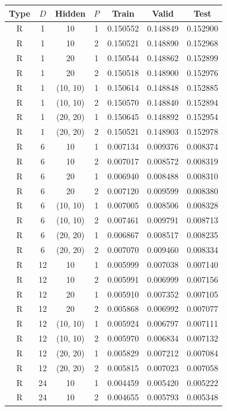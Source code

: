 \documentclass[10pt,a4paper]{article}
\begin{document}
\begin{table}[h]
\centering
\begin{tabular}{|c|c|c|c||c|c|c|}
\hline
Type & $D$ & Hidden & $P$ & Train & Valid & Test\\
\hline
R & 1 & 10 & 1 & 0.150552 & 0.148849 & 0.152900\\
R & 1 & 10 & 2 & 0.150521 & 0.148890 & 0.152968\\
R & 1 & 20 & 1 & 0.150544 & 0.148862 & 0.152899\\
R & 1 & 20 & 2 & 0.150518 & 0.148900 & 0.152976\\
R & 1 & (10, 10) & 1 & 0.150614 & 0.148848 & 0.152885\\
R & 1 & (10, 10) & 2 & 0.150570 & 0.148840 & 0.152894\\
R & 1 & (20, 20) & 1 & 0.150645 & 0.148892 & 0.152954\\
R & 1 & (20, 20) & 2 & 0.150521 & 0.148903 & 0.152978\\
\hline
R & 6 & 10 & 1 & 0.007134 & 0.009376 & 0.008374\\
R & 6 & 10 & 2 & 0.007017 & 0.008572 & 0.008319\\
R & 6 & 20 & 1 & 0.006940 & 0.008488 & 0.008310\\
R & 6 & 20 & 2 & 0.007120 & 0.009599 & 0.008380\\
R & 6 & (10, 10) & 1 & 0.007005 & 0.008506 & 0.008328\\
R & 6 & (10, 10) & 2 & 0.007461 & 0.009791 & 0.008713\\
R & 6 & (20, 20) & 1 & 0.006867 & 0.008517 & 0.008235\\
R & 6 & (20, 20) & 2 & 0.007070 & 0.009460 & 0.008334\\
\hline
R & 12 & 10 & 1 & 0.005999 & 0.007038 & 0.007140\\
R & 12 & 10 & 2 & 0.005991 & 0.006999 & 0.007156\\
R & 12 & 20 & 1 & 0.005910 & 0.007352 & 0.007105\\
R & 12 & 20 & 2 & 0.005868 & 0.006992 & 0.007077\\
R & 12 & (10, 10) & 1 & 0.005924 & 0.006797 & 0.007111\\
R & 12 & (10, 10) & 2 & 0.005970 & 0.006834 & 0.007132\\
R & 12 & (20, 20) & 1 & 0.005829 & 0.007212 & 0.007084\\
R & 12 & (20, 20) & 2 & 0.005815 & 0.007023 & 0.007058\\
\hline
R & 24 & 10 & 1 & 0.004459 & 0.005420 & 0.005222\\
R & 24 & 10 & 2 & 0.004655 & 0.005793 & 0.005348\\

\end{tabular}
\end{table}
\end{document}
